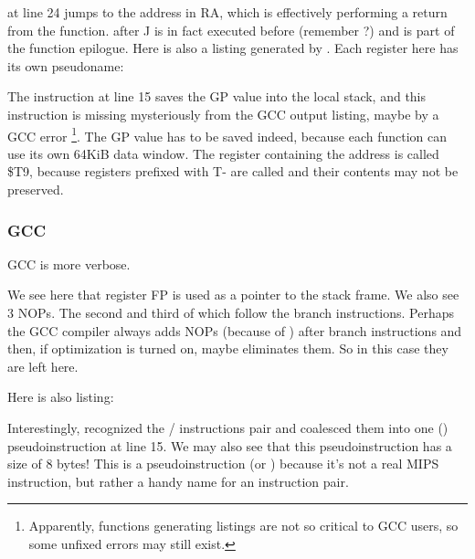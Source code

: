 
 at line 24 jumps to the address in \ac{RA}, which is effectively performing a return from the function.
 after J is in fact executed before  (remember ?) and is part of the function epilogue.
Here is also a listing generated by \IDA. Each register here has its own pseudoname:



The instruction at line 15 saves the GP value into the local stack, and this instruction is missing mysteriously from the GCC output listing, maybe by a GCC error
\footnote{Apparently, functions generating listings are not so critical to GCC users, so some unfixed errors may still exist.}.
The GP value has to be saved indeed, because each function can use its own 64KiB data window.
The register containing the \puts address is called \$T9, because registers prefixed with T- are called
 and their contents may not be preserved.

\subsubsection{\NonOptimizing GCC}

\NonOptimizing GCC is more verbose.



We see here that register FP is used as a pointer to the stack frame.
We also see 3 \ac{NOP}s.
The second and third of which follow the branch instructions.
Perhaps the GCC compiler always adds \ac{NOP}s (because of ) after branch
instructions and then, if optimization is turned on, maybe eliminates them.
So in this case they are left here.

Here is also \IDA listing:




Interestingly, \IDA recognized the / instructions pair and coalesced them into one 
 () pseudoinstruction at line 15.
We may also see that this pseudoinstruction has a size of 8 bytes!
This is a pseudoinstruction (or ) because it's not a real MIPS instruction, but rather
a handy name for an instruction pair.

